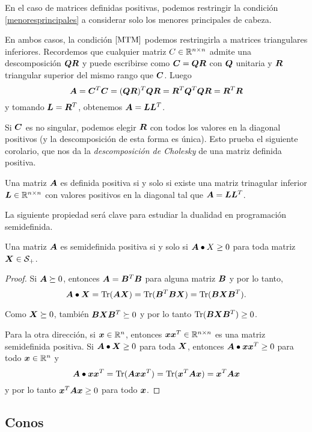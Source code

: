 En el caso de matrices definidas positivas, podemos restringir la condición \ref{menoresprincipales} a considerar solo los menores principales de cabeza.

En ambos casos, la condición $\ref{MTM}$ podemos restringirla a matrices triangulares inferiores. Recordemos que cualquier matriz $C \in \mathbb{R}^{n\times n}$ admite una descomposición $\bm{Q}\bm{R}$ y puede escribirse como $\bm{C} = \bm{Q} \bm{R}$ con $\bm{Q}$ unitaria y $\bm{R}$ triangular superior del mismo rango que $\bm{C}$. Luego
$$
\bm{A} = \bm{C}^T \bm{C} = (\bm{Q} \bm{R})^T \bm{Q} \bm{R} = \bm{R}^T \bm{Q}^T \bm{Q} \bm{R} = \bm{R}^T \bm{R}
$$
y tomando $\bm{L} = \bm{R}^T$, obtenemos $\bm{A} = \bm{L} \bm{L}^T$.

Si $\bm{C}$ es no singular, podemos elegir $\bm{R}$ con todos los valores en la diagonal positivos (y la descomposición de esta forma es única).
Esto prueba el siguiente corolario, que nos da la \emph{descomposición de Cholesky} de una matriz definida positiva.

\begin{corollary}
Una matriz $\bm{A}$ es definida positiva si y solo si existe una matriz trinagular inferior $\bm{L} \in \mathbb{R}^{n\times n}$ con valores positivos en la diagonal tal que $\bm{A} = \bm{L} \bm{L}^T$.
\end{corollary}


La siguiente propiedad será clave para estudiar la dualidad en programación semidefinida.

\begin{theorem}\label{teo:traza}
Una matriz $\bm{A}$ es semidefinida positiva si y solo si $\bm{A} \bullet X \ge 0$ para toda matriz $\bm{X} \in {\mathcal S_+}$.
\end{theorem}

\begin{proof}
Si $\bm{A} \succeq 0$, entonces $\bm{A} = \bm{B}^T \bm{B}$ para alguna matriz $\bm{B}$ y por lo tanto,
$$
\bm{A} \bullet \bm{X} = \operatorname{Tr}(\bm{A}\bm{X}) = \operatorname{Tr}(\bm{B}^T \bm{B} \bm{X}) = \operatorname{Tr}(\bm{B} \bm{X} \bm{B}^T).
$$

Como $\bm{X} \succeq 0$, también $\bm{B} \bm{X} \bm{B}^T \succeq 0$ y por lo tanto $\operatorname{Tr}(\bm{B} \bm{X} \bm{B}^T) \ge 0$.

Para la otra dirección, si $\bm{x} \in \mathbb{R}^n$, entonces $\bm{x} \bm{x}^T \in \mathbb{R}^{n\times n}$ es una matriz semidefinida positiva. Si $\bm{A} \bullet \bm{X} \ge 0$ para toda $\bm{X}$, entonces $\bm{A} \bullet \bm{x} \bm{x}^T  \ge 0$ para todo $\bm{x} \in \mathbb{R}^{n}$ y
$$
\bm{A} \bullet \bm{x}\bm{x}^T = \operatorname{Tr}(\bm{A} \bm{x} \bm{x}^T) = \operatorname{Tr}(\bm{x}^T \bm{A} \bm{x}) = \bm{x}^T \bm{A} \bm{x}
$$
y por lo tanto $\bm{x}^T \bm{A} \bm{x} \ge 0$ para todo $\bm{x}$.
\end{proof}

\subsection{Conos}

